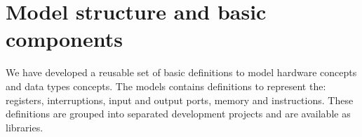 \documentclass[a4paper]{llncs}
\begin{document}
%



\section{Model structure and basic components}
\label{sec:models}

We have developed a reusable set of basic definitions to model hardware concepts and data types
concepts. The models contains definitions to represent the: registers, interruptions, input and output
ports, memory and instructions. These definitions are grouped into separated development projects
and are available as libraries.
\end{document}
